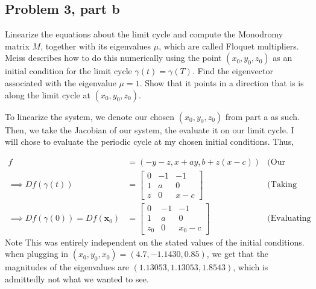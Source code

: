 \subsection{Problem 3, part b}
Linearize the equations about the limit cycle and compute the Monodromy matrix $M$, together with its eigenvalues $\mu$, which are called Floquet multipliers. Meiss describes how to do this numerically using the point $(x_0, y_0, z_0)$ as an initial condition for the limit cycle $\gamma(t) = \gamma(T)$. Find the eigenvector associated with the eigenvalue $\mu = 1$. Show that it points in a direction that is is along the limit cycle at $(x_0, y_0, z_0)$.
\partbreak
\begin{solution}

    To linearize the system, we denote our chosen $(x_0, y_0, z_0)$ from part a as such. Then, we take the Jacobian of our system, the evaluate it on our limit cycle. I will chose to evaluate the periodic cycle at my chosen initial conditions. Thus, 

    \alignbreak
    \begin{align}
        f &= (-y - z, x + ay, b + z(x - c)) &\text{(Our system.)}\nonumber\\
        \implies Df(\gamma(t)) &= \begin{bmatrix}0 &-1 &-1\\ 1 &a &0\\ z &0 &x - c\end{bmatrix} &\text{(Taking Jacobian.)}\nonumber\\
        \implies Df(\gamma(0)) = Df(\textbf{x}_0) &=  \begin{bmatrix}0 &-1 &-1\\ 1 &a &0\\ z_0 &0 &x_0 - c\end{bmatrix} &\text{(Evaluating on limit cycle.)}\nonumber
    \end{align}
    \alignbreak
    Note This was entirely independent on the stated values of the initial conditions. when plugging in $(x_0, y_0, x_0) = (4.7, -1.1430, 0.85)$, we get that the magnitudes of the eigenvalues are $(1.13053, 1.13053, 1.8543)$, which is admittedly not what we wanted to see. 
\end{solution}

\newpage
